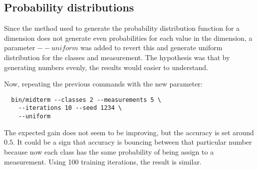 \documentclass[letterpaper, conference]{IEEEtran}
\begin{document}
\subsection{Probability distributions}

Since the method used to generate the probability distribution function for a dimension does not generate even probabilities for each value in the dimension, a parameter $--uniform$ was added to revert this and generate uniform distribution for the classes and measurement. The hypothesis was that by generating numbers evenly, the results would easier to understand.

Now, repeating the previous commands with the new parameter:

\begin{verbatim}
  bin/midterm --classes 2 --measurements 5 \
    --iterations 10 --seed 1234 \
    --uniform
\end{verbatim}

\begin{figure}[hbt]
  \label{fig:10-training-2-class-uniform}
  \caption{}
\end{figure}

The expected gain does not seem to be improving, but the accuracy is set around $0.5$. It could be a sign that accuracy is bouncing between that particular number because now each class has the same probability of being assign to a measurement. Using 100 training iterations, the result is similar.
\end{document}
